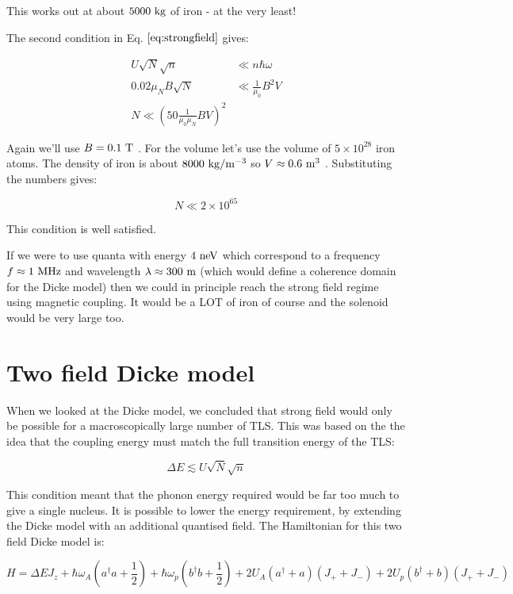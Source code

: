 \documentclass[
]{article}
\renewcommand{\[}{\begin{equation}}
\renewcommand{\]}{\end{equation}}
\begin{document}
This works out at about \(5000 \ \rm kg\) of iron - at the very least!

The second condition in Eq. \(\ref{eq:strongfield}\) gives:

\[
\begin{aligned}
U\sqrt{N}\sqrt{n} &\ll  n\hbar \omega \\
0.02 \mu_N B \sqrt{N} &\ll \frac{1}{\mu_0} B^2 V  \\
N \ll \left(50\frac{1}{\mu_0\mu_N}BV\right)^2
\end{aligned}
\]

Again we'll use \(B=0.1 \ \rm T\) . For the volume let's use the volume
of \(5 \times 10^{28}\) iron atoms. The density of iron is about
\(8000 \ \rm kg/m^{-3}\) so \(V \approx 0.6 \ \rm m^3\) . Substituting
the numbers gives:

\[
N \ll 2\times 10^{65}
\]

This condition is well satisfied.

If we were to use quanta with energy \(4 \ \rm neV\) which correspond to
a frequency \(f \approx 1 \ \rm MHz\) and wavelength
\(\lambda \approx 300 \ \rm  m\) (which would define a coherence domain
for the Dicke model) then we could in principle reach the strong field
regime using magnetic coupling. It would be a LOT of iron of course and
the solenoid would be very large too.

\section{Two field Dicke model}\label{two-field-dicke-model}

When we looked at the Dicke model, we concluded that strong field would
only be possible for a macroscopically large number of TLS. This was
based on the the idea that the coupling energy must match the full
transition energy of the TLS:

\[
\Delta E \lesssim U\sqrt{N}\sqrt{n}
\]

This condition meant that the phonon energy required would be far too
much to give a single nucleus. It is possible to lower the energy
requirement, by extending the Dicke model with an additional quantised
field. The Hamiltonian for this two field Dicke model is:

\[
H =  \Delta E J_{z} + \hbar\omega_A\left(a^{\dagger}a +\frac{1}{2}\right) +\hbar\omega_p\left(b^{\dagger}b +\frac{1}{2}\right) + 2U_A\left( a^{\dagger} + a \right)(J_{+} + J_{-}) + 2U_p\left( b^{\dagger} + b \right)(J_{+} + J_{-})
\label{eq:dicke2Hpseudo}
\]
\end{document}
